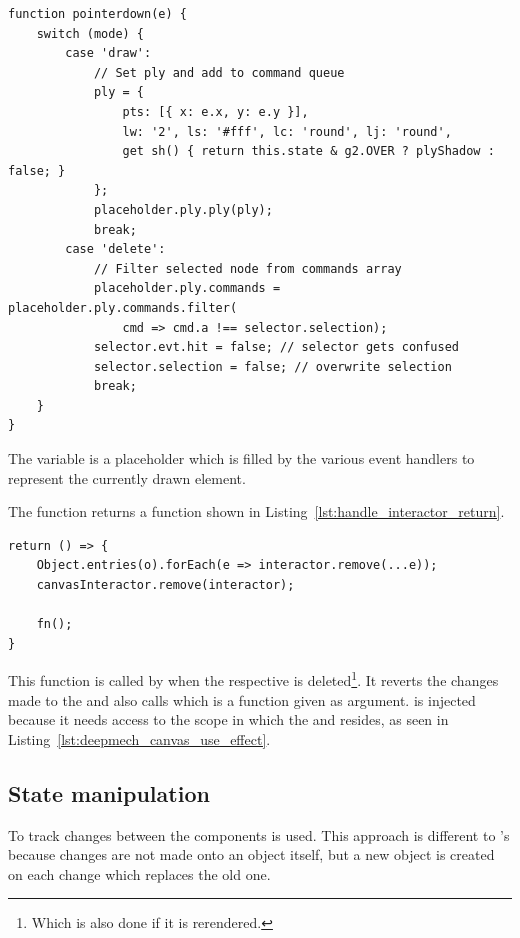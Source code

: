 \begin{lstlisting}[label={lst:handle_interactor_pointerdown}, caption={\code{pointerdown} function in \code{handleInteractor}.}]
function pointerdown(e) {
    switch (mode) {
        case 'draw':
            // Set ply and add to command queue
            ply = {
                pts: [{ x: e.x, y: e.y }],
                lw: '2', ls: '#fff', lc: 'round', lj: 'round',
                get sh() { return this.state & g2.OVER ? plyShadow : false; }
            };
            placeholder.ply.ply(ply);
            break;
        case 'delete':
            // Filter selected node from commands array
            placeholder.ply.commands = placeholder.ply.commands.filter(
                cmd => cmd.a !== selector.selection);
            selector.evt.hit = false; // selector gets confused
            selector.selection = false; // overwrite selection
            break;
    }
}
\end{lstlisting}

The  variable is a placeholder which is filled by the various event handlers to represent the currently drawn  element.

The  function returns a function shown in Listing~\ref{lst:handle_interactor_return}.

\begin{lstlisting}[label={lst:handle_interactor_return}, caption={Return value of \code{handleInteractor}.}]
return () => {
    Object.entries(o).forEach(e => interactor.remove(...e));
    canvasInteractor.remove(interactor);

    fn();
}
\end{lstlisting}

This function is called by  when the respective  is deleted\footnote{Which is also done if it is rerendered.}.
It reverts the changes made to the  and also calls  which is a function given as argument.
 is injected because it needs access to the scope in which the  and  resides, as seen in Listing~\ref{lst:deepmech_canvas_use_effect}.

\subsection{State manipulation}\label{ch:state_manipulation}

To track changes between the components \cite{Abramov2021} is used.
This approach is different to 's because changes are not made onto an object itself, but a new object is created on each change which replaces the old one.

